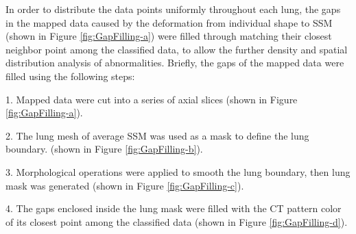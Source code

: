 In order to distribute the data points uniformly throughout each lung, the gaps in the mapped data caused by the deformation from individual shape to SSM (shown in Figure \ref{fig:GapFilling-a}) were filled through matching their closest neighbor point among the classified data, to allow the further density and spatial distribution analysis of abnormalities. Briefly, the gaps of the mapped data were filled using the following steps: 

1. Mapped data were cut into a series of axial slices (shown in Figure \ref{fig:GapFilling-a}).

2. The lung mesh of average SSM was used as a mask to define the lung boundary. (shown in Figure \ref{fig:GapFilling-b}).

3. Morphological operations were applied to smooth the lung boundary, then lung mask was generated (shown in Figure \ref{fig:GapFilling-c}).

4. The gaps enclosed inside the lung mask were filled with the CT pattern color of its closest point among the classified data (shown in Figure \ref{fig:GapFilling-d}).


